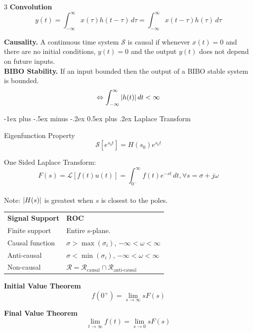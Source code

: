 \documentclass[10pt,landscape]{article}
\makeatletter
\renewcommand{\section}{\@startsection{section}{1}{0mm}%
        {-1ex plus -.5ex minus -.2ex}%
            {0.5ex plus .2ex}%
                {\normalfont\large\bfseries}}
\makeatother
\begin{document}
\begin{multicols}{3}
    \textbf{Convolution}
    \[y(t) = \int_{-\infty}^{\infty}x(\tau)h(t-\tau)\,d\tau = \int_{-\infty}^{\infty}x(t-\tau)h(\tau)\,d\tau\]
    
    \textbf{Causality. }A continuous time system $\mathcal{S}$ is causal if whenever $x(t) = 0$ and there are no initial conditions, $y(t) = 0$ and the output $y(t)$ does not depend on future inputs.\\[6pt]
    \textbf{BIBO Stability. }If an input bounded then the output of a BIBO stable system is bounded.
    \[\Leftrightarrow \int_{-\infty}^{\infty} \abs{h(t)}\,dt < \infty\]
    
    \section{Laplace Transform}
    
    Eigenfunction Property
    \[\mathcal{S}[e^{s_0t}] = H(s_0)e^{s_0t}\]
    
    One Sided Laplace Transform:\\
    \[F(s) = \mathcal{L}[f(t)u(t)] = \int_{0^-}^{\infty}f(t)e^{-st}\,dt, \forall s = \sigma + j\omega\]\\
    
    Note: $\abs{H(s)}$ is greatest when $s$ is closest to the poles.
    
    \vspace{10pt}
    
    \begin{tabular}{ll}  
    	\textbf{Signal Support} & \textbf{ROC}\\
    	Finite support & Entire s-plane.\\
    	Causal function & $\sigma > \max(\sigma_i)$,  $-\infty < \omega < \infty$\\
    	Anti-causal & $\sigma < \min(\sigma_i)$,  $-\infty < \omega < \infty$\\
    	Non-causal & $\mathcal{R} = \mathcal{R}_\text{causal} \cap \mathcal{R}_\text{anti-causal}$\\
    \end{tabular}
    \vspace{0.5em}
    
    \textbf{Initial Value Theorem}\\
    \[ f(0^+) = \lim_{s\rightarrow\infty} sF(s)\]
    
    \textbf{Final Value Theorem}\\
    \[\lim_{t\rightarrow\infty} f(t) =\lim_{s\rightarrow 0} sF(s)\]
    

\end{multicols}
\end{document}
